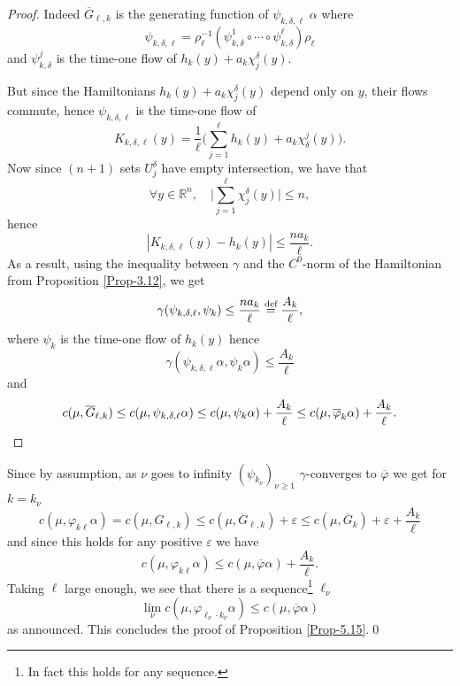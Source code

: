 \documentclass[JEP,XML,SOM,NoFloatCountersInSection,Unicode,published]{cedram}
\numberwithin{equation}{section}
\theoremstyle{plain}
\theoremstyle{definition}
\theoremstyle{remark}
\begin{document}
\begin{proof} Indeed $\overline G_{\ell,k}$ is the generating function of
$\psi_{k,\delta,\ell}\; \alpha $ where
\[
\psi_{k,\delta,\ell}= \rho^{-1}_{\ell} \left(\psi^{1}_{k,\delta} \circ \cdots \circ
\psi^{\ell}_{k,\delta} \right) \rho_{\ell}
\]
and $\psi^{j}_{k,\delta}$ is the time-one flow of ${h}_{k} (y) + a_{k}
\chi_{j}^{\delta} (y)$.

But since the Hamiltonians ${h}_{k} (y) + a_{k}
\chi_{j}^{\delta} (y)$ depend only on $y$, their flows commute, hence $\psi_{k,\delta,\ell}$
is the time-one flow of
\[
K_{k,\delta,\ell}(y) =
\frac{1}{\ell} \biggl(\sum_{j=1}^{\ell} {h}_{k}(y) + a_{k}
\chi^{j}_{\delta} (y)\biggr).
\]
Now since $(n+1)$ sets $U_{j}^{\delta}$ have empty intersection, we
have that
\[
\forall y \in {\mathbb R}^n, \quad \biggl \vert \sum_{j=1}^{\ell} \chi_{j}^{\delta}(y) \biggr\vert
\leq n,
\]
hence
\[
\left\vert K_{k,\delta,\ell} (y) - {h}_{k}(y) \right\vert \leq \frac{n a_{k}}{\ell}.
\]
As a result, using the inequality between $\gamma$ and the $C^0$-norm of the Hamiltonian from Proposition \ref{Prop-3.12}, we get
\[
\gamma (\psi_{k,\delta,\ell}, \psi_{k}) \leq \frac{na_{k}}{\ell}\overset{\textup{def}}=\frac{A_{k}}{\ell},
\]
where $\psi_{k}$ is the time-one flow of ${h}_{k}(y)$ hence
\[
\gamma \left(\psi_{k,\delta,\ell} \alpha, \psi_{k} \alpha \right)
\leq \frac{A_{k}}{\ell}
\]
and
\[
c(\mu, \overline G_{\ell, k}) \leq c (\mu,\psi_{k,\delta,\ell} \alpha)\leq c (\mu, \psi_{k} \alpha) +\frac{A_{k}}{\ell} \leq c (\mu, \overline\varphi_{k}\alpha) +\frac{A_{k}}{\ell}.\qedhere
\]
\end{proof}

Since by assumption, as $\nu$ goes to infinity $(\psi_{k_{\nu}})_{\nu \geq 1}$ $\gamma$-converges to
$\overline\varphi$ we get for $k=k_{\nu}$
\[
c(\mu, \varphi_{k\ell} \alpha) = c (\mu, G_{\ell,k}) \leq
c (\mu,\overline G_{\ell,k}) + \varepsilon \leq c (\mu,\overline G_{k}) +
\varepsilon +\frac{A_{k}}{\ell}
\]
and since this holds for any positive $ \varepsilon $ we have
\[
c(\mu, \varphi_{k\ell} \alpha)\leq c (\mu, \overline\varphi \alpha) + \frac{A_{k}}{\ell}.
\]
Taking $\ell$ large enough, we see that there is a sequence\footnote{In fact this holds for any sequence.} $\ell_{\nu}$
\[
\lim_{\nu} c(\mu, \varphi_{\ell_{\nu}\cdot k_{\nu}}\alpha)\leq c (\mu, \overline\varphi \alpha)
\]
as announced.
This concludes the proof of Proposition \ref{Prop-5.15}.\qed
\end{document}
